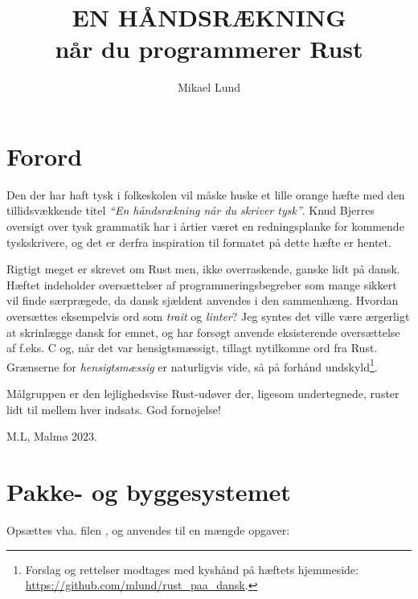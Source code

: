 \documentclass{article}
\author{Mikael Lund}
\title{EN HÅNDSRÆKNING\\når du programmerer Rust}
\date{}
\begin{document}
\maketitle
\begin{center}

\end{center}
\clearpage
\newpage
\tableofcontents



\newpage
\section*{Forord}

Den der har haft tysk i folkeskolen vil måske huske et lille orange hæfte med den tillids\-vækkende titel \emph{``En hånds\-rækning når du skriver tysk''}.
Knud Bjerres oversigt over tysk grammatik har i årtier været en redningsplanke for kommende tysk\-skrivere, og det er derfra inspiration til formatet på dette hæfte er hentet.

Rigtigt meget er skrevet om Rust men, ikke overraskende, ganske lidt på dansk.
Hæftet indeholder oversættelser af programmeringsbegreber som 
 mange sikkert vil finde særprægede, da dansk sjældent anvendes i den sammenhæng.
Hvordan oversættes eksempelvis ord som \emph{trait} og \emph{linter}?
Jeg syntes det ville være ærgerligt at skrinlægge dansk for emnet, og har forsøgt anvende eksisterende oversættelse af f.eks. C og, når det var hensigtsmæssigt, tillagt nytilkomne ord fra Rust.
Grænserne for \emph{hensigtsmæssig} er naturligvis vide, så på for\-hånd undskyld\footnote{Forslag og rettelser modtages med kyshånd på hæftets hjemmeside: \url{https://github.com/mlund/rust_paa_dansk}.}.

Mål\-gruppen er den lejlig\-heds\-vise Rust-udøver der, ligesom undertegnede, ruster lidt til mellem hver indsats. God fornøjelse!

\vspace{0.5cm}
M.L, Malmø 2023.


\newpage
\section*{Pakke- og byggesystemet }
Opsættes vha. filen , og anvendes til en mængde opgaver:
\end{document}
